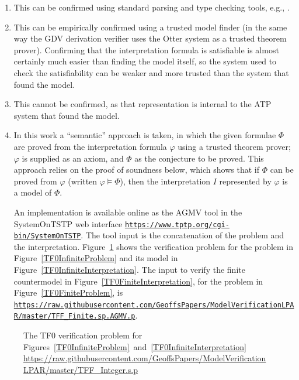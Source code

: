 \documentclass{easychair}
\newcommand{\smalltt}[1]{\small \texttt{#1}}
\begin{document}
\begin{enumerate}
\item This can be confirmed using standard parsing and type checking tools, e.g., \cite{VS06,HR15}.
\item This can be empirically confirmed using a trusted model finder (in the same way the GDV 
      derivation verifier \cite{Sut06} uses the Otter system \cite{McC03-Otter} as a trusted 
      theorem prover).
      Confirming that the interpretation formula is satisfiable is almost certainly much 
      easier than finding the model itself, so the system used to check the satisfiability can 
      be weaker and more trusted than the system that found the model.
\item This cannot be confirmed, as that representation is internal to the ATP system that found
      the model.
\item In this work a ``semantic'' approach is taken, in which the given formulae $\Phi$ are proved 
      from the interpretation formula $\varphi$ using a trusted theorem prover; $\varphi$ is 
      supplied as an axiom, and $\Phi$ as the conjecture to be proved.
      This approach relies on the proof of soundness below, which shows that if $\Phi$ can be 
      proved from $\varphi$ (written $\varphi \models \Phi$), then the interpretation $I$ 
      represented by $\varphi$ is a model of $\Phi$.

      An implementation is available online as the AGMV tool in the SystemOnTSTP \cite{Sut07-CSR} 
      web interface {\smalltt{\url{https://www.tptp.org/cgi-bin/SystemOnTSTP}}}.
      The tool input is the concatenation of the problem and the interpretation.
      Figure~\ref{TF0InfiniteVerification} shows the verification problem for the problem in 
      Figure~\ref{TF0InfiniteProblem} and its model in Figure~\ref{TF0InfiniteInterpretation}.
      The input to verify the finite countermodel in Figure~\ref{TF0FiniteInterpretation}, for the 
      problem in Figure~\ref{TF0FiniteProblem}, is
      {\smalltt{\url{https://raw.githubusercontent.com/GeoffsPapers/ModelVerificationLPAR/master/TFF_Finite.sp.AGMV.p}}}.
\end{enumerate}

\begin{figure}[htbp]
\small
{}

\caption{The TF0 verification problem for 
Figures~\ref{TF0InfiniteProblem}~and~\ref{TF0InfiniteInterpretation}\\
{\footnotesize \url{https://raw.githubusercontent.com/GeoffsPapers/ModelVerificationLPAR/master/TFF_Integer.s.p}}}
\label{TF0InfiniteVerification}
\end{figure}
\end{document}
